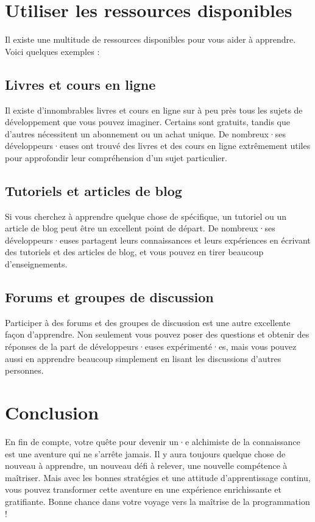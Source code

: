 \section{Utiliser les ressources disponibles}

Il existe une multitude de ressources disponibles pour vous aider à apprendre. Voici quelques exemples :

\subsection{Livres et cours en ligne}

Il existe d'innombrables livres et cours en ligne sur à peu près tous les sujets de développement que vous pouvez imaginer. Certains sont gratuits, tandis que d'autres nécessitent un abonnement ou un achat unique. De nombreux·ses développeurs·euses ont trouvé des livres et des cours en ligne extrêmement utiles pour approfondir leur compréhension d'un sujet particulier.

\subsection{Tutoriels et articles de blog}

Si vous cherchez à apprendre quelque chose de spécifique, un tutoriel ou un article de blog peut être un excellent point de départ. De nombreux·ses développeurs·euses partagent leurs connaissances et leurs expériences en écrivant des tutoriels et des articles de blog, et vous pouvez en tirer beaucoup d'enseignements.

\subsection{Forums et groupes de discussion}

Participer à des forums et des groupes de discussion est une autre excellente façon d'apprendre. Non seulement vous pouvez poser des questions et obtenir des réponses de la part de développeurs·euses expérimenté·es, mais vous pouvez aussi en apprendre beaucoup simplement en lisant les discussions d'autres personnes.

\section{Conclusion}

En fin de compte, votre quête pour devenir un·e alchimiste de la connaissance est une aventure qui ne s'arrête jamais. Il y aura toujours quelque chose de nouveau à apprendre, un nouveau défi à relever, une nouvelle compétence à maîtriser. Mais avec les bonnes stratégies et une attitude d'apprentissage continu, vous pouvez transformer cette aventure en une expérience enrichissante et gratifiante. Bonne chance dans votre voyage vers la maîtrise de la programmation !


